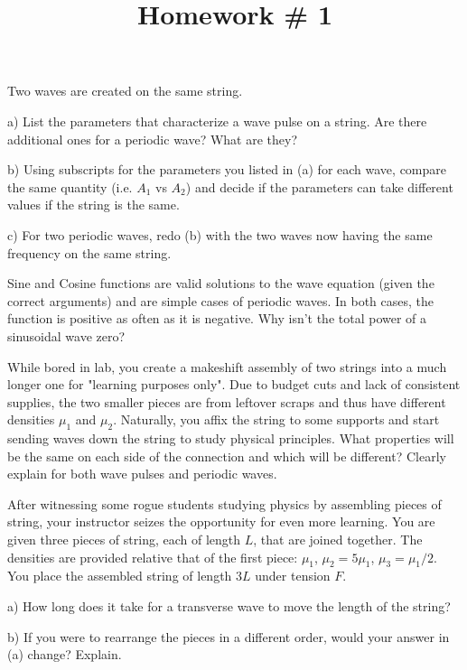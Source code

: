 \documentclass[10pt]{article}
\newenvironment{problem}[2][Problem]{\begin{trivlist}
\item[\hskip \labelsep {\bfseries #1}\hskip \labelsep {\bfseries #2.}]}{\end{trivlist}}
\begin{document}
 \title{Homework \# 1}
\date{}
\maketitle
 
\begin{problem}{1}
Two waves are created on the same string.
\item
a) List the parameters that characterize a wave pulse on a string. Are there additional ones for a periodic wave? What are they?
\item
b) Using subscripts for the parameters you listed in (a) for each wave, compare the same quantity (i.e. $A_1$ vs $A_2$) and decide if the parameters can take different values if the string is the same.
\item
c) For two periodic waves, redo (b) with the two waves now having the same frequency on the same string.
\end{problem}

\begin{problem}{2}
Sine and Cosine functions are valid solutions to the wave equation (given the correct arguments) and are simple cases of periodic waves. In both cases, the function is positive as often as it is negative. Why isn't the total power of a sinusoidal wave zero?
\end{problem}

\begin{problem}{3}
While bored in lab, you create a makeshift assembly of two strings into a much longer one for "learning purposes only". Due to budget cuts and lack of consistent supplies, the two smaller pieces are from leftover scraps and thus have different densities $\mu_1$ and $\mu_2$. Naturally, you affix the string to some supports and start sending waves down the string to study physical principles. What properties will be the same on each side of the connection and which will be different? Clearly explain for both wave pulses and periodic waves.
\end{problem}

\begin{problem}{4}
After witnessing some rogue students studying physics by assembling pieces of string, your instructor seizes the opportunity for even more learning.  You are given three pieces of string, each of length $L$, that are joined together. The densities are provided relative that of the first piece: $\mu_1$, $\mu_2=5\mu_1$, $\mu_3=\mu_1/2$. You place the assembled string of length $3L$ under tension $F$.
\item
a) How long does it take for a transverse wave to move the length of the string?
\item
b) If you were to rearrange the pieces in a different order, would your answer in (a) change? Explain.
\end{problem}
\end{document}
